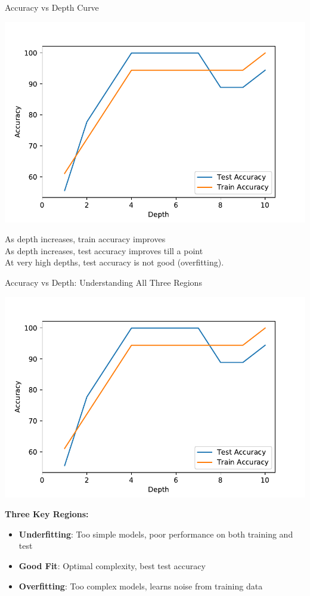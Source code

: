 \documentclass{beamer}
\begin{document}
	\begin{frame}{Accuracy vs Depth Curve}
		\begin{center}
		\includegraphics[scale=0.55]{acc-depth-plot}
	\end{center}
	\pause As depth increases, train accuracy improves\\
	\pause As depth increases, test accuracy improves till a point\\
	\pause At very high depths, test accuracy is not good (overfitting). 

	\end{frame}

	\begin{frame}{Accuracy vs Depth: Understanding All Three Regions}
	\begin{center}
	\includegraphics[scale=0.5]{acc-depth-plot}
	\end{center}
	
	\begin{keypointsbox}
	\textbf{Three Key Regions:}
	\begin{itemize}
	\item \textbf{Underfitting}: Too simple models, poor performance on both training and test
	\item \textbf{Good Fit}: Optimal complexity, best test accuracy
	\item \textbf{Overfitting}: Too complex models, learns noise from training data
	\end{itemize}
	\end{keypointsbox}
	\end{frame}
\end{document}
